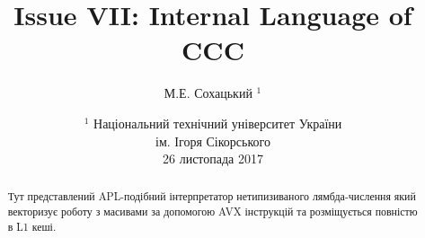 \documentclass{article}
\begin{document}
\author { М.Е. Сохацький $^1$ }
\title { Issue VII: Internal Language of CCC }
\date{ \small $^1$ Національний технічний університет України \\
       ім. Ігоря Сікорського \\
       26 листопада 2017 }
\maketitle

\begin{abstract}
Тут представлений APL-подібний інтерпретатор нетипизиваного лямбда-числення
який векторизує роботу з масивами за допомогою AVX інструкцій та
розміщується повністю в L1 кеші.

\end{abstract}
\end{document}
